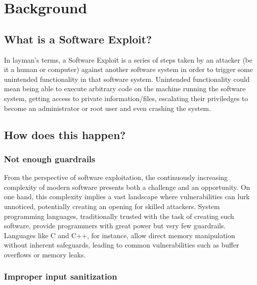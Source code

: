 \documentclass{article}
\begin{document}
\section{Background}%

\subsection{What is a Software Exploit?}%

In layman's terms, a Software Exploit is a series of steps taken by an attacker
(be it a human or computer) against another software system in order to trigger
some unintended functionality in that software system. Unintended functionality
could mean being able to execute arbitrary code on the machine running the
software system, getting access to private information/files, escalating their
priviledges to become an administrator or root user and even crashing the system.

\subsection{How does this happen?}%

\subsubsection{Not enough guardrails}%

From the perspective of software exploitation, the continuously increasing
complexity of modern software presents both a challenge and an opportunity. On
one hand, this complexity implies a vast landscape where vulnerabilities can
lurk unnoticed, potentially creating an opening for skilled attackers. System
programming languages, traditionally trusted with the task of creating such
software, provide programmers with great power but very few guardrails.
Languages like C and C++, for instance, allow direct memory manipulation without
inherent safeguards, leading to common vulnerabilities such as buffer overflows
or memory leaks.

\subsubsection{Improper input sanitization}%
\end{document}
